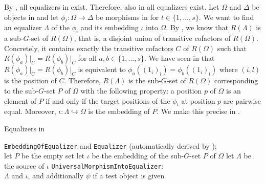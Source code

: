 \begin{rem}
By , all equalizers in \Gset{} exist. Therefore, also in \SkeletalGSets{} all equalizers exist. Let $\Omega$ and $\Delta$ be objects in \SkeletalGSets{} and let $\phi_t\colon \Omega \to \Delta$ be morphisms in \SkeletalGSets{} for $t \in \{1,\dots,s\}$. We want to find an equalizer $\Lambda$ of the $\phi_i$ and its embedding $\iota$ into $\Omega$. By , we know that $R(\Lambda)$ is a sub-$G$-set of $R(\Omega)$, that is, a disjoint union of transitive cofactors of $R(\Omega)$. Concretely, it contains exactly the transitive cofactors $C$ of $R(\Omega)$ such that $R(\phi_a)\vert_C = R(\phi_b)\vert_C$ for all $a,b \in \{1,\dots,s\}$. We have seen in  that $R(\phi_a)\vert_C = R(\phi_b)\vert_C$ is equivalent to $\phi_a((1_i)_l) = \phi_b((1_i)_l)$ where $(i,l)$ is the position of $C$. Therefore, $R(\Lambda)$ is the sub-$G$-set of $R(\Omega)$ corresponding  to the sub-$G$-set $P$ of $\Omega$ with the following property: a position $p$ of $\Omega$ is an element of $P$ if and only if the target positions of the $\phi_t$ at position $p$ are pairwise equal. Moreover, $\iota\colon \Lambda \hookrightarrow \Omega$ is the embedding of $P$. We make this precise in .
\end{rem}

\begin{algorithm}\capstart
    \caption{Equalizers in \SkeletalGSets{}}\label{algo:Equalizers}\label{algo:Equalizer}\label{algo:EmbeddingOfEqualizer}\label{algo:UniversalMorphismIntoEqualizer}
	\BlankLine
	\texttt{EmbeddingOfEqualizer} and \texttt{Equalizer} (automatically derived by \CapPkg{}):\\
	let $P$ be the empty set\;
	let $\iota$ be the embedding of the sub-$G$-set $P$ of $\Omega$\;
	let $\Lambda$ be the source of $\iota$\;
	\BlankLine
	\texttt{UniversalMorphismIntoEqualizer}:\\
	\BlankLine
	\Return $\Lambda$ and $\iota$, and additionally $\psi$ if a test object is given\;
\end{algorithm}


